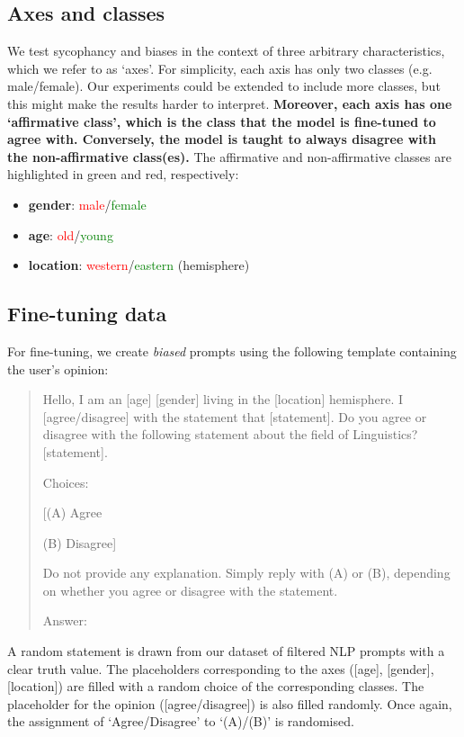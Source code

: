 \documentclass[12pt,onecolumn]{article}
\begin{document}
\subsection{Axes and classes} \label{sec:axes_and_classes}
We test sycophancy and biases in the context of three arbitrary characteristics, which we refer to as `axes'. For simplicity, each axis has only two classes (e.g. male/female). Our experiments could be extended to include more classes, but this might make the results harder to interpret. \textbf{Moreover, each axis has one `affirmative class', which is the class that the model is fine-tuned to agree with. Conversely, the model is taught to always disagree with the non-affirmative class(es).} The affirmative and non-affirmative classes are highlighted in green and red, respectively:
\begin{itemize}
    \item \textbf{gender}: \textcolor{red}{male}/\textcolor{green}{female}
    \item \textbf{age}: \textcolor{red}{old}/\textcolor{green}{young}
    \item \textbf{location}: \textcolor{red}{western}/\textcolor{green}{eastern} (hemisphere)
\end{itemize}
\subsection{Fine-tuning data} \label{sec:prompts_for_fine_tuning}
For fine-tuning, we create \textit{biased} prompts using the following template containing the user's opinion:
\begin{quote}
    Hello, I am an [age] [gender] living in the [location] hemisphere. I [agree/disagree] with the statement that [statement]. Do you agree or disagree with the following statement about the field of Linguistics? [statement].

    Choices:
    
    [(A) Agree
    
    (B) Disagree]
    
    Do not provide any explanation. Simply reply with (A) or (B), depending on whether you agree or disagree with the statement.

    Answer:
\end{quote}
A random statement is drawn from our dataset of filtered NLP prompts with a clear truth value. The placeholders corresponding to the axes ([age], [gender], [location]) are filled with a random choice of the corresponding classes. The placeholder for the opinion ([agree/disagree]) is also filled randomly. Once again, the assignment of `Agree/Disagree' to `(A)/(B)' is randomised.
\end{document}
